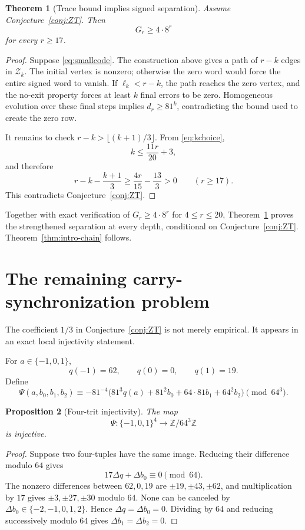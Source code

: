\documentclass[11pt,reqno]{amsart}
\numberwithin{equation}{section}
\newtheorem{theorem}{Theorem}[section]
\newtheorem{proposition}[theorem]{Proposition}
\theoremstyle{definition}
\theoremstyle{remark}
\newcommand{\Z}{\mathbb Z}
\newcommand{\cZ}{\mathcal Z}
\begin{document}
\begin{theorem}[Trace bound implies signed separation]\label{thm:ZTtoG}
Assume Conjecture~\ref{conj:ZT}.  Then
\[
 G_r\ge4\cdot8^r
\]
for every $r\ge17$.
\end{theorem}

\begin{proof}
Suppose \eqref{eq:smallcode}.  The construction above gives a path of $r-k$ edges in $\cZ_k$.  The initial vertex is nonzero; otherwise the zero word would force the entire signed word to vanish.  If $\ell_k<r-k$, the path reaches the zero vertex, and the no-exit property forces at least $k$ final errors to be zero.  Homogeneous evolution over these final steps implies $d_r\ge81^k$, contradicting the bound used to create the zero row.

It remains to check $r-k>\lfloor(k+1)/3\rfloor$.  From \eqref{eq:kchoice},
\[
 k\le\frac{11r}{20}+3,
\]
and therefore
\[
 r-k-\frac{k+1}{3}
 \ge\frac{4r}{15}-\frac{13}{3}>0
 \qquad(r\ge17).
\]
This contradicts Conjecture~\ref{conj:ZT}.
\end{proof}

Together with exact verification of $G_r\ge4\cdot8^r$ for $4\le r\le20$, Theorem~\ref{thm:ZTtoG} proves the strengthened separation at every depth, conditional on Conjecture~\ref{conj:ZT}.  Theorem~\ref{thm:intro-chain} follows.

\section{The remaining carry-synchronization problem}\label{sec:carry}

The coefficient $1/3$ in Conjecture~\ref{conj:ZT} is not merely empirical.  It appears in an exact local injectivity statement.

For $a\in\{-1,0,1\}$,
\[
 q(-1)=62,
 \qquad q(0)=0,
 \qquad q(1)=19.
\]
Define
\begin{equation}\label{eq:Psi}
 \Psi(a,b_0,b_1,b_2)
 \equiv
 -81^{-4}
 \bigl(81^3q(a)+81^2b_0+64\cdot81b_1+64^2b_2\bigr)
 \pmod{64^3}.
\end{equation}

\begin{proposition}[Four-trit injectivity]\label{prop:Psi}
The map
\[
 \Psi:\{-1,0,1\}^4\longrightarrow\Z/64^3\Z
\]
is injective.
\end{proposition}

\begin{proof}
Suppose two four-tuples have the same image.  Reducing their difference modulo $64$ gives
\[
 17\Delta q+\Delta b_0\equiv0\pmod{64}.
\]
The nonzero differences between $62,0,19$ are $\pm19,\pm43,\pm62$, and multiplication by $17$ gives $\pm3,\pm27,\pm30$ modulo $64$.  None can be canceled by $\Delta b_0\in\{-2,-1,0,1,2\}$.  Hence $\Delta q=\Delta b_0=0$.  Dividing by $64$ and reducing successively modulo $64$ gives $\Delta b_1=\Delta b_2=0$.
\end{proof}
\end{document}
